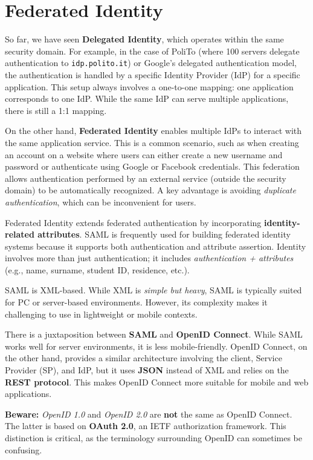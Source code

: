 \section{Federated Identity}

So far, we have seen \textbf{Delegated Identity}, which operates
within the same security domain. For example, in the case of PoliTo
(where 100 servers delegate authentication to \texttt{idp.polito.it})
or Google’s delegated authentication model, the authentication is
handled by a specific Identity Provider (IdP) for a specific
application. This setup always involves a one-to-one mapping: one
application corresponds to one IdP. While the same IdP can serve
multiple applications, there is still a 1:1 mapping.

On the other hand, \textbf{Federated Identity} enables multiple IdPs
to interact with the same application service. This is a common
scenario, such as when creating an account on a website where users
can either create a new username and password or authenticate using
Google or Facebook credentials. This federation allows authentication
performed by an external service (outside the security domain) to be
automatically recognized. A key advantage is avoiding
\textit{duplicate authentication}, which can be inconvenient for
users.

Federated Identity extends federated authentication by incorporating
\textbf{identity-related attributes}. SAML is frequently used for
building federated identity systems because it supports both
authentication and attribute assertion. Identity involves more than
just authentication; it includes \textit{authentication + attributes}
(e.g., name, surname, student ID, residence, etc.).

SAML is XML-based. While XML is \textit{simple but heavy}, SAML is
typically suited for PC or server-based environments. However, its
complexity makes it challenging to use in lightweight or mobile
contexts.

There is a juxtaposition between \textbf{SAML} and \textbf{OpenID
Connect}. While SAML works well for server environments, it is less
mobile-friendly. OpenID Connect, on the other hand, provides a similar
architecture involving the client, Service Provider (SP), and IdP, but
it uses \textbf{JSON} instead of XML and relies on the \textbf{REST
protocol}. This makes OpenID Connect more suitable for mobile and web
applications.

\begin{boxH}

\textbf{Beware:} \textit{OpenID 1.0} and \textit{OpenID 2.0} are
\textbf{not} the same as OpenID Connect. The latter is based on
\textbf{OAuth 2.0}, an IETF authorization framework. This distinction
is critical, as the terminology surrounding OpenID can sometimes be
confusing.

\end{boxH}


